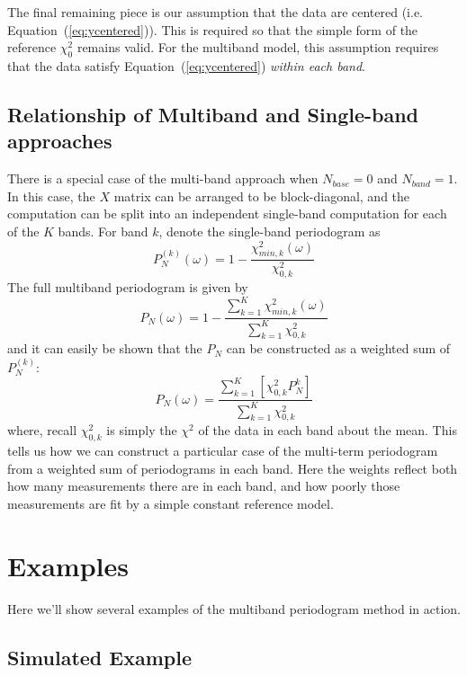 \documentclass[12pt,preprint]{aastex}
\newcommand{\Eq}[1]{Equation~(\ref{eq:#1})}
\newcommand{\eq}[1]{\Eq{#1}}
\newcommand{\sectlabel}[1]{\label{sect:#1}}
\begin{document}
The final remaining piece is our assumption that the data are centered (i.e. \eq{ycentered}). This is required so that the simple form of the reference $\chi^2_0$ remains valid. For the multiband model, this assumption requires that the data satisfy \eq{ycentered} {\it within each band}.

\subsection{Relationship of Multiband and Single-band approaches}
There is a special case of the multi-band approach when $N_{base}=0$ and $N_{band}=1$. In this case, the $X$ matrix can be arranged to be block-diagonal, and the computation can be split into an independent single-band computation for each of the $K$ bands. For band $k$, denote the single-band periodogram as
\begin{equation}
  P_N^{(k)}(\omega) = 1 - \frac{\chi^2_{min, k}(\omega)}{\chi^2_{0,k}}
\end{equation}
The full multiband periodogram is given by
\begin{equation}
  P_N(\omega) = 1 - \frac{\sum_{k=1}^K\chi^2_{min, k}(\omega)}{\sum_{k=1}^K\chi^2_{0,k}}
\end{equation}
and it can easily be shown that the $P_N$ can be constructed as a weighted sum of $P_N^{(k)}$:
\begin{equation}
  P_N(\omega) = \frac{\sum_{k=1}^K\left[\chi^2_{0,k}P_N^{k}\right]}{\sum_{k=1}^K\chi^2_{0,k}}
\end{equation}
where, recall $\chi^2_{0,k}$ is simply the $\chi^2$ of the data in each band about the mean. This tells us how we can construct a particular case of the multi-term periodogram from a weighted sum of periodograms in each band. Here the weights reflect both how many measurements there are in each band, and how poorly those measurements are fit by a simple constant reference model.

\section{Examples}
Here we'll show several examples of the multiband periodogram method in action.

\subsection{Simulated Example}
\sectlabel{Simulated}
\end{document}
